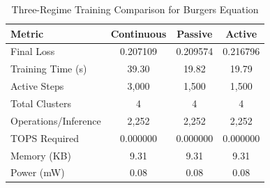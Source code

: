 \begin{table}[htbp]
\centering
\caption{Three-Regime Training Comparison for Burgers Equation}
\label{tab:three_regime_comparison}
\begin{tabular}{l|ccc}
\hline
\textbf{Metric} & \textbf{Continuous} & \textbf{Passive} & \textbf{Active} \\
\hline
Final Loss & 0.207109 & 0.209574 & 0.216796 \\
Training Time (s) & 39.30 & 19.82 & 19.79 \\
Active Steps & 3,000 & 1,500 & 1,500 \\
Total Clusters & 4 & 4 & 4 \\
Operations/Inference & 2,252 & 2,252 & 2,252 \\
TOPS Required & 0.000000 & 0.000000 & 0.000000 \\
Memory (KB) & 9.31 & 9.31 & 9.31 \\
Power (mW) & 0.08 & 0.08 & 0.08 \\
\hline
\end{tabular}
\end{table}
